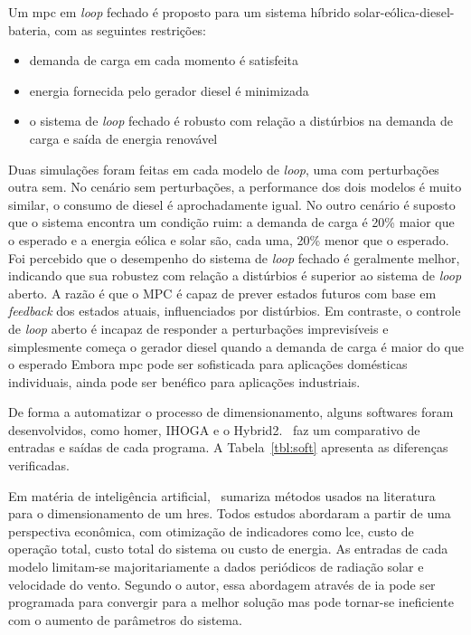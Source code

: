 Um \acrshort{mpc} em \emph{loop} fechado é proposto para
um sistema híbrido solar-eólica-diesel-bateria, com as seguintes restrições:
\begin{itemize}
	\item demanda de carga em cada momento é satisfeita
	\item energia fornecida pelo gerador diesel é minimizada
	\item o sistema de \emph{loop} fechado é robusto com relação a distúrbios na demanda de carga e saída de energia renovável
\end{itemize}

Duas simulações foram feitas em cada modelo de \emph{loop}, uma com perturbações
outra sem. No cenário sem perturbações, a performance dos dois modelos é muito
similar, o consumo de diesel é aprochadamente igual. No outro cenário é suposto
que o sistema encontra um condição ruim: a demanda de carga é 20\% maior que o
esperado e a energia eólica e solar são, cada uma, 20\% menor que o esperado.
Foi percebido que o desempenho do sistema de \emph{loop} fechado é geralmente
melhor, indicando que sua robustez com relação a distúrbios é superior ao
sistema de \emph{loop} aberto.  A razão é que o MPC é capaz de prever estados
futuros com base em \emph{feedback} dos estados atuais, influenciados por
distúrbios.  Em contraste, o controle de \emph{loop} aberto é incapaz de
responder a perturbações imprevisíveis e simplesmente começa o gerador diesel
quando a demanda de carga é maior do que o esperado Embora \acrshort{mpc} pode
ser sofisticada para aplicações domésticas individuais, ainda pode ser benéfico
para aplicações industriais.

De forma a automatizar o processo de dimensionamento, alguns softwares foram
desenvolvidos, como \acrshort{homer}, IHOGA e o Hybrid2.~\cite{Upadhyay_2014}
faz um comparativo de entradas e saídas de cada programa. A
Tabela~\ref{tbl:soft} apresenta as diferenças verificadas.



Em matéria de inteligência artificial,~\cite{Upadhyay_2014} sumariza métodos
usados na literatura para o dimensionamento de um \acrshort{hres}. Todos estudos
abordaram a partir de uma perspectiva econômica, com otimização de indicadores
como \acrshort{lce}, custo de operação total, custo total do sistema ou custo de
energia. As entradas de cada modelo limitam-se majoritariamente a dados
periódicos de radiação solar e velocidade do vento. Segundo o autor, essa
abordagem através de \acrshort{ia} pode ser programada para convergir para a
melhor solução mas pode tornar-se ineficiente com o aumento de parâmetros do
sistema.

